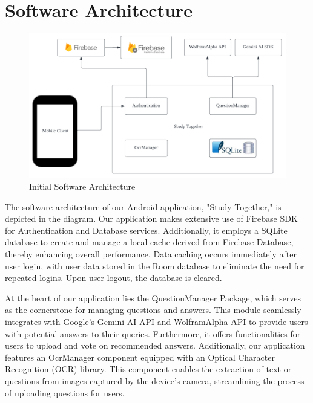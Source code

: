 \chapter{Software Architecture}\label{software_architecture}

\begin{figure}[h]
       \centering
       \includegraphics[scale = .80]{Figures/StudyTogether_Architecture.png}
       \caption{\footnotesize Initial Software Architecture}
       \label{StudyTogether_Architecture}
\end{figure}

The software architecture of our Android application, "Study Together," is depicted in the diagram. Our application makes extensive use of Firebase SDK for Authentication and Database services. Additionally, it employs a SQLite database to create and manage a local cache derived from Firebase Database, thereby enhancing overall performance. Data caching occurs immediately after user login, with user data stored in the Room database to eliminate the need for repeated logins. Upon user logout, the database is cleared.

At the heart of our application lies the QuestionManager Package, which serves as the cornerstone for managing questions and answers. This module seamlessly integrates with Google's Gemini AI API and WolframAlpha API to provide users with potential answers to their queries. Furthermore, it offers functionalities for users to upload and vote on recommended answers. Additionally, our application features an OcrManager component equipped with an Optical Character Recognition (OCR) library. This component enables the extraction of text or questions from images captured by the device's camera, streamlining the process of uploading questions for users.
